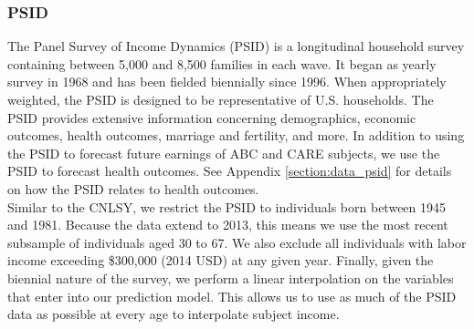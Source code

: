 \subsubsection{PSID}
\label{app:subject_income_psid}

\noindent The Panel Survey of Income Dynamics (PSID) is a longitudinal household survey containing between 5,000
and 8,500 families in each wave. It began as yearly survey in 1968 and has been fielded biennially since 1996.
When appropriately weighted, the PSID is designed to be representative of U.S. households. The PSID
provides extensive information concerning demographics, economic outcomes, health outcomes, marriage
and fertility, and more. In addition to using the PSID to forecast future earnings of ABC and CARE subjects, we
use the PSID to forecast health outcomes. See Appendix \ref{section:data_psid} for details on how the
PSID relates to health outcomes. \\

\noindent Similar to the CNLSY, we restrict the PSID to individuals born between 1945 and 1981. Because the data
extend to 2013, this means we use the most recent subsample of individuals aged 30 to 67.
We also exclude all individuals with labor income exceeding \$300,000 (2014 USD) at any given year.
Finally, given the biennial nature of the survey, we perform a linear interpolation on the variables
that enter into our prediction model. This allows us to use as much of the PSID data as possible at
every age to interpolate subject income. \\

